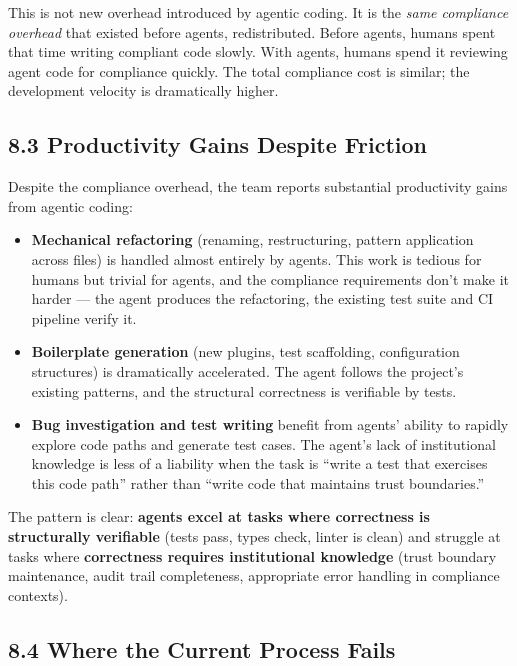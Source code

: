 \documentclass[a4paper,11pt]{report}
\providecommand{\tightlist}{%
  \setlength{\itemsep}{0pt}\setlength{\parskip}{0pt}}
\begin{document}
This is not new overhead introduced by agentic coding. It is the
\emph{same compliance overhead} that existed before agents,
redistributed. Before agents, humans spent that time writing compliant
code slowly. With agents, humans spend it reviewing agent code for
compliance quickly. The total compliance cost is similar; the
development velocity is dramatically higher.

\hypertarget{productivity-gains-despite-friction}{%
\subsection{8.3 Productivity Gains Despite
Friction}\label{productivity-gains-despite-friction}}

Despite the compliance overhead, the team reports substantial
productivity gains from agentic coding:

\begin{itemize}
\tightlist
\item
  \textbf{Mechanical refactoring} (renaming, restructuring, pattern
  application across files) is handled almost entirely by agents. This
  work is tedious for humans but trivial for agents, and the compliance
  requirements don't make it harder --- the agent produces the
  refactoring, the existing test suite and CI pipeline verify it.
\item
  \textbf{Boilerplate generation} (new plugins, test scaffolding,
  configuration structures) is dramatically accelerated. The agent
  follows the project's existing patterns, and the structural
  correctness is verifiable by tests.
\item
  \textbf{Bug investigation and test writing} benefit from agents'
  ability to rapidly explore code paths and generate test cases. The
  agent's lack of institutional knowledge is less of a liability when
  the task is ``write a test that exercises this code path'' rather than
  ``write code that maintains trust boundaries.''
\end{itemize}

The pattern is clear: \textbf{agents excel at tasks where correctness is
structurally verifiable} (tests pass, types check, linter is clean) and
struggle at tasks where \textbf{correctness requires institutional
knowledge} (trust boundary maintenance, audit trail completeness,
appropriate error handling in compliance contexts).

\hypertarget{where-the-current-process-fails}{%
\subsection{8.4 Where the Current Process
Fails}\label{where-the-current-process-fails}}
\end{document}
